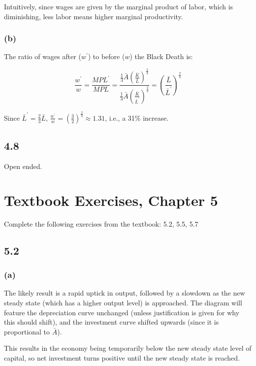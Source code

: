\documentclass{article}
\begin{document}
Intuitively, since wages are given by the marginal product of labor, which is diminishing, less labor means higher marginal productivity. 

\subsubsection*{(b)}

The ratio of wages after ($w^{'}$) to before ($w$) the Black Death is:

\[ \frac{w^{'}}{w} = \frac{MPL^{'}}{MPL} = \frac{\frac13 \bar{A} \left( \frac{\bar{K}}{\bar{L}} \right)^{\frac23}}{\frac13 \bar{A} \left( \frac{\bar{K}}{\bar{L}^{'}} \right)^{\frac23}} = \left( \frac{\bar{L}}{\bar{L}^{'}} \right)^{\frac23}\]

Since $\bar{L}^{'} = \frac23 \bar{L}$, $\frac{w^{'}}{w} = \left( \frac32 \right)^{\frac23} \approx 1.31$, i.e., a 31\% increase.

\subsection*{4.8}

Open ended.

\color{black} 

\section{Textbook Exercises, Chapter 5}

Complete the following exercises from the textbook: 5.2, 5.5, 5.7

\color{red} 

\subsection*{5.2}

\subsubsection*{(a)}

The likely result is a rapid uptick in output, followed by a slowdown as the new steady state (which has a higher output level) is approached. The diagram will feature the depreciation curve unchanged (unless justification is given for why this should shift), and the investment curve shifted upwards (since it is proportional to $\bar{A}$).

This results in the economy being temporarily below the new steady state level of capital, so net investment turns positive until the new steady state is reached.
\end{document}
